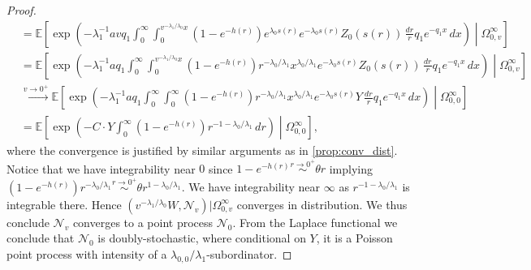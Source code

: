 \documentclass{article}
\numberwithin{equation}{section}
\begin{document}
\begin{proof}
\begin{align*}
  &=\mathbb{E}\left[\exp\left(-\lambda_1^{-1}avq_1\int_0^\infty \int_0^{v^{-\lambda_1/\lambda_0}x} (1-e^{-h(r)})e^{\lambda_0 s(r)}e^{-\lambda_0 s(r)}Z_0(s(r))\,\frac{dr}{r} q_1 e^{-q_1 x}\,dx\right)\middle| \Omega_{0,v}^\infty\right]\\
  &=\mathbb{E}\left[\exp\left(-\lambda_1^{-1}aq_1\int_0^\infty \int_0^{v^{-\lambda_1/\lambda_0}x} (1-e^{-h(r)})r^{-\lambda_0/\lambda_1}x^{\lambda_0/\lambda_1}e^{-\lambda_0 s(r)}Z_0(s(r))\,\frac{dr}{r} q_1 e^{-q_1 x}\,dx\right)\middle| \Omega_{0,v}^\infty\right]\\
  &\overset{v\to 0^+}{\to} \mathbb{E}\left[\exp\left(-\lambda_1^{-1}aq_1\int_0^\infty \int_0^{\infty} (1-e^{-h(r)})r^{-\lambda_0/\lambda_1}x^{\lambda_0/\lambda_1}e^{-\lambda_0 s(r)}Y\,\frac{dr}{r} q_1 e^{-q_1 x}\,dx\right)\middle| \Omega_{0,0}^\infty\right]\\
  &=\mathbb{E}\left[\exp\left(-C\cdot Y\int_0^\infty(1-e^{-h(r)})r^{-1-\lambda_0/\lambda_1}\,dr\right)\middle|\Omega_{0,0}^\infty\right],
\end{align*}
where the convergence is justified by similar arguments as in \ref{prop:conv_dist}. Notice that we have integrability near $0$ since $1-e^{-h(r)}\overset{r\to 0^+}{\sim} \theta r$ implying $(1-e^{-h(r)})r^{-\lambda_0/\lambda_1}\overset{r\to 0^+}{\sim}\theta r^{1-\lambda_0/\lambda_1}$. We have integrability near $\infty$ as $r^{-1-\lambda_0/\lambda_1}$ is integrable there. Hence $(v^{-\lambda_1/\lambda_0}W,\mathcal{N}_v)|\Omega_{0,v}^\infty$ converges in distribution. We thus conclude $\mathcal{N}_v$ converges to a point process $\mathcal{N}_0$. From the Laplace functional we conclude that $\mathcal{N}_0$ is doubly-stochastic, where conditional on $Y$, it is a Poisson point process with intensity of a $\lambda_{0,0}/\lambda_1$-subordinator. 


\end{proof}
\end{document}
